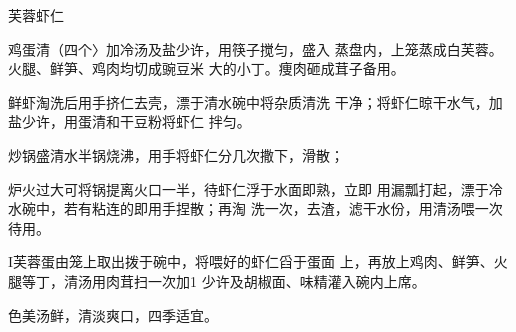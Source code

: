 \begin{recipe}{芙蓉虾仁}

\ingredients


\cooking

\step 鸡蛋清（四个〉加冷汤及盐少许，用筷子搅匀，盛入 蒸盘内，上笼蒸成白芙蓉。火腿、鲜笋、鸡肉均切成豌豆米 大的小丁。痩肉砸成茸子备用。

\step 鲜虾淘洗后用手挤仁去壳，漂于清水碗中将杂质清洗 干净；将虾仁晾干水气，加盐少许，用蛋清和干豆粉将虾仁 拌匀。

\step 炒锅盛清水半锅烧沸，用手将虾仁分几次撒下，滑散；

炉火过大可将锅提离火口一半，待虾仁浮于水面即熟，立即 用漏瓢打起，漂于冷水碗中，若有粘连的即用手捏散；再淘 洗一次，去渣，滤干水份，用清汤喂一次待用。

I芙蓉蛋由笼上取出拨于碗中，将喂好的虾仁舀于蛋面 上，再放上鸡肉、鲜笋、火腿等丁，清汤用肉茸扫一次加1 少许及胡椒面、味精灌入碗内上席。

\notes

色美汤鲜，清淡爽口，四季适宜。

\end{recipe}

